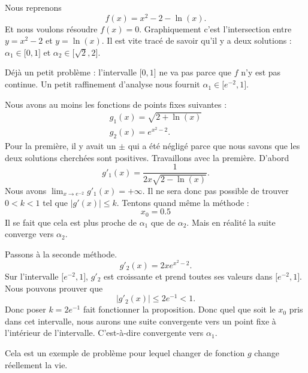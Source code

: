 \begin{example}
	Nous reprenons
	\begin{equation}
		f(x)=x^2-2-\ln(x).
	\end{equation}
	Et nous voulons résoudre \( f(x)=0\). Graphiquement c'est l'intersection entre \( y=x^2-2\) et \( y=\ln(x)\). Il est vite tracé de savoir qu'il y a deux solutions  : \( \alpha_1\in\mathopen[ 0 , 1 \mathclose]\) et \( \alpha_2\in\mathopen[ \sqrt{2} , 2 \mathclose]\).

	Déjà un petit problème : l'intervalle \( \mathopen[ 0 , 1 \mathclose]\) ne va pas parce que \( f\) n'y est pas continue. Un petit raffinement d'analyse nous fournit \( \alpha_1\in\mathopen[ e^{-2} , 1 \mathclose]\).

	Nous avons au moins les fonctions de points fixes suivantes :
	\begin{subequations}
		\begin{align}
			g_1(x)=\sqrt{ 2+\ln(x) } \\
			g_2(x)=e^{x^2-2}.
		\end{align}
	\end{subequations}
	Pour la première, il y avait un \( \pm\) qui a été négligé parce que nous savons que les deux solutions cherchées sont positives.
	Travaillons avec la première. D'abord
	\begin{equation}
		g'_1(x)=\frac{ 1 }{ 2x\sqrt{ 2-\ln(x) } }.
	\end{equation}
	Nous avons \( \lim_{x\to e^{-2}} g'_1(x)=+\infty\). Il ne sera donc pas possible de trouver \( 0<k<1\) tel que \( | g'(x) |\leq k\). Tentons quand même la méthode :
	\begin{equation}
		x_0=0.5
	\end{equation}
	Il se fait que cela est plus proche de \( \alpha_1\) que de \( \alpha_2\). Mais en réalité la suite converge vers \( \alpha_2\).

	Passons à la seconde méthode.
	\begin{equation}
		g'_2(x)=2xe^{x^2-2}.
	\end{equation}
	Sur l'intervalle \( \mathopen[ e^{-2} , 1 \mathclose]\), \( g'_2\) est croissante et prend toutes ses valeurs dans \( \mathopen[ e^{-2} , 1 \mathclose]\). Nous pouvons prouver que
	\begin{equation}
		| g'_2(x) |\leq 2e^{-1}<1.
	\end{equation}
	Donc poser \( k=2e^{-1}\) fait fonctionner la proposition. Donc quel que soit le \( x_0\) pris dans cet intervalle, nous aurons une suite convergente vers un point fixe à l'intérieur de l'intervalle. C'est-à-dire convergente vers \( \alpha_1\).

	Cela est un exemple de problème pour lequel changer de fonction \( g\) change réellement la vie.
\end{example}


